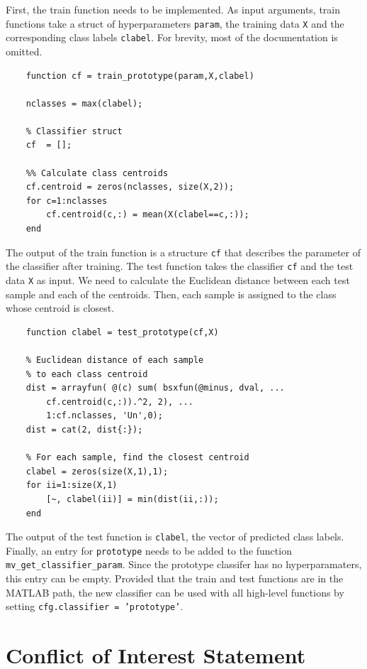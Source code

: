 \documentclass[utf8]{frontiersSCNS} %
\newcommand{\ttt}[1]{\texttt{#1}}
\begin{document}
First, the train function needs to be implemented. As input arguments, train functions  take a  struct of hyperparameters \ttt{param},  the training data \ttt{X} and the corresponding  class labels \ttt{clabel}. For brevity, most of the documentation is omitted.

\begin{verbatim}
    function cf = train_prototype(param,X,clabel)

    nclasses = max(clabel);

    % Classifier struct
    cf  = [];

    %% Calculate class centroids
    cf.centroid = zeros(nclasses, size(X,2));
    for c=1:nclasses
        cf.centroid(c,:) = mean(X(clabel==c,:));
    end
\end{verbatim}

The output of the train function is a structure \ttt{cf} that describes the parameter of the classifier after training. The test function takes the classifier \ttt{cf} and the test data \ttt{X} as input. We need to calculate the Euclidean distance between each test sample and each of the centroids. Then, each sample is assigned to the class whose centroid is closest.

\begin{verbatim}
    function clabel = test_prototype(cf,X)

    % Euclidean distance of each sample 
    % to each class centroid
    dist = arrayfun( @(c) sum( bsxfun(@minus, dval, ...
        cf.centroid(c,:)).^2, 2), ...
        1:cf.nclasses, 'Un',0);
    dist = cat(2, dist{:});

    % For each sample, find the closest centroid
    clabel = zeros(size(X,1),1);
    for ii=1:size(X,1)
        [~, clabel(ii)] = min(dist(ii,:));
    end

\end{verbatim}

The output of the test function is \ttt{clabel}, the vector of predicted class labels. Finally, an entry for \ttt{prototype} needs to be added to the function \ttt{mv\_get\_classifier\_param}. Since the prototype classifer has no hyperparamaters, this entry can be empty. Provided that the train and test functions are in the MATLAB path, the new classifier can be used with all high-level functions by setting \ttt{cfg.classifier = 'prototype'}.


\section*{Conflict of Interest Statement}
\end{document}
